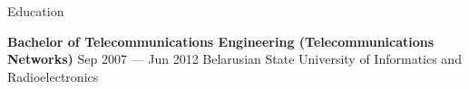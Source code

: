 \documentclass{resume} %
\begin{document}

\begin{rSection}{Education}

\textbf{Bachelor of Telecommunications Engineering (Telecommunications Networks)} \hfill {Sep 2007 --- Jun 2012} Belarusian State University of Informatics and Radioelectronics

\end{rSection}
\end{document}
